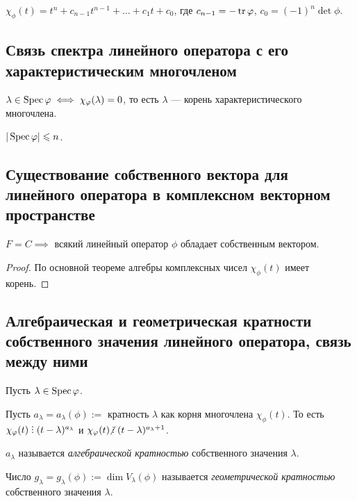 $\chi_\phi(t) = t^n + c_{n - 1}t^{n - 1} + \dots + c_1 t + c_0$, где $c_{n - 1} = -\operatorname{\mathop{\mathrm{tr}}} \varphi$, $c_0 = (-1)^n \det \phi$.

\subsection{Связь спектра линейного оператора с его характеристическим многочленом}

\begin{corollary}
    $\lambda \in \operatorname{\mathop{\mathrm{Spec}}} \varphi \iff \chi_\varphi(\lambda) = 0$, то есть $\lambda$ --- корень характеристического многочлена.
\end{corollary}

\begin{corollary}
    $|\operatorname{\mathop{\mathrm{Spec}}} \varphi| \leqslant n$.   
\end{corollary}


\subsection{Существование собственного вектора для линейного оператора в комплексном векторном пространстве}

\begin{corollary}
    $F = C \implies $ всякий линейный оператор $\phi$ обладает собственным вектором.
\end{corollary}

\begin{proof}
    По основной теореме алгебры комплексных чисел $\chi_\phi(t)$ имеет корень. 
\end{proof}


\subsection{Алгебраическая и геометрическая кратности собственного значения линейного оператора, связь между ними}

Пусть $\lambda \in \operatorname{\mathop{\mathrm{Spec}}} \varphi$.

Пусть $a_\lambda = a_\lambda(\phi) := $ кратность $\lambda$ как корня многочлена $\chi_\phi(t)$. То есть $\chi_\phi(t) \divby (t - \lambda)^{a_\lambda}$ и $\chi_\phi(t) \!\!\not\;\divby (t - \lambda)^{a_\lambda + 1}$.

\begin{definition}
    $a_\lambda$ называется \textit{алгебраической кратностью} собственного значения $\lambda$.
\end{definition}

\begin{definition}
    Число $g_\lambda = g_\lambda(\phi) := \dim V_\lambda(\phi)$ называется \textit{геометрической кратностью} собственного значения $\lambda$.
\end{definition}

